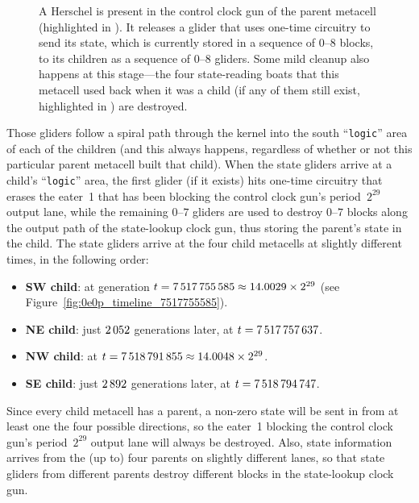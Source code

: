\begin{figure}[!htb]
	\centering
	\caption{A Herschel is present in the control clock gun of the parent metacell (highlighted in ). It releases a glider that uses one-time circuitry to send its state, which is currently stored in a sequence of $0$--$8$ blocks, to its children as a sequence of $0$--$8$ gliders. Some mild cleanup also happens at this stage---the four state-reading boats that this metacell used back when it was a child (if any of them still exist, highlighted in ) are destroyed.}
	\label{fig:0e0p_timeline_7516192768}
\end{figure}

Those gliders follow a spiral path through the kernel into the south ``\texttt{logic}'' area of each of the children (and this always happens, regardless of whether or not this particular parent metacell built that child). When the state gliders arrive at a child's ``\texttt{logic}'' area, the first glider (if it exists) hits one-time circuitry that erases the eater~1 that has been blocking the control clock gun's period~$2^{29}$ output lane, while the remaining $0$--$7$ gliders are used to destroy $0$--$7$ blocks along the output path of the state-lookup clock gun, thus storing the parent's state in the child. The state gliders arrive at the four child metacells at slightly different times, in the following order:\smallskip

\begin{itemize}
	\item \textbf{SW child}: at generation $t = 7{\,}517{\,}755{\,}585 \approx 14.0029 \times 2^{29}$ (see Figure~\ref{fig:0e0p_timeline_7517755585}).\smallskip
	
	\item \textbf{NE child}: just $2{\,}052$ generations later, at $t = 7{\,}517{\,}757{\,}637$.\smallskip
	
	\item \textbf{NW child}: at $t = 7{\,}518{\,}791{\,}855 \approx 14.0048 \times 2^{29}$.\smallskip
	
	\item \textbf{SE child}: just $2{\,}892$ generations later, at $t = 7{\,}518{\,}794{\,}747$.\smallskip
\end{itemize}

Since every child metacell has a parent, a non-zero state will be sent in from at least one the four possible directions, so the eater~1 blocking the control clock gun's period~$2^{29}$ output lane will always be destroyed. Also, state information arrives from the (up to) four parents on slightly different lanes, so that state gliders from different parents destroy different blocks in the state-lookup clock gun.

